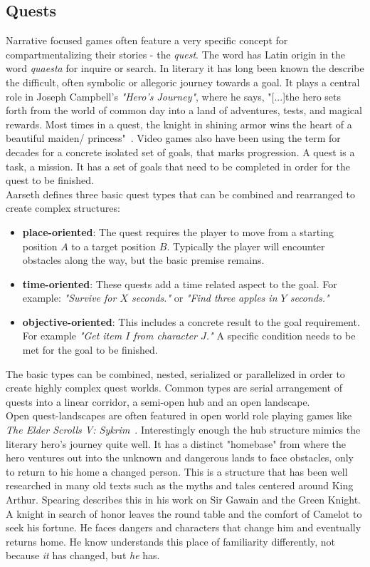 \subsection{Quests}
Narrative focused games often feature a very specific concept for compartmentalizing their stories - the \textit{quest}. The word has Latin origin in the word \textit{quaesta} for inquire or search. In literary it has long been known the describe the difficult, often symbolic or allegoric journey towards a goal. It plays a central role in Joseph Campbell's \textit{"Hero's Journey"}, where he says, "[...]the hero sets forth from the world of common day into a land of adventures, tests, and magical rewards. Most times in a quest, the knight in shining armor wins the heart of a beautiful maiden/ princess"~\cite{Campbell2008}. Video games also have been using the term for decades for a concrete isolated set of goals, that marks progression. A quest is a task, a mission. It has a set of goals that need to be completed in order for the quest to be finished.\\
Aarseth defines three basic quest types that can be combined and rearranged to create complex structures:
\begin{itemize}
	\item \textbf{place-oriented}: The quest requires the player to move from a starting position $A$ to a target position $B$. Typically the player will encounter obstacles along the way, but the basic premise remains.
	\item \textbf{time-oriented}: These quests add a time related aspect to the goal. For example: \textit{"Survive for $X$ seconds."} or \textit{"Find three apples in $Y$ seconds."}
	\item \textbf{objective-oriented}: This includes a concrete result to the goal requirement. For example \textit{"Get item $I$ from character $J$."} A specific condition needs to be met for the goal to be finished.
\end{itemize} 
The basic types can be combined, nested, serialized or parallelized in order to create highly complex quest worlds. Common types are serial arrangement of quests into a linear corridor, a semi-open hub and an open landscape.~\cite{Aarseth2005}\\
Open quest-landscapes are often featured in open world role playing games like \textit{The Elder Scrolls V: Sykrim}~\cite{skyrim}. Interestingly enough the hub structure mimics the literary hero's journey quite well. It has a distinct "homebase" from where the hero ventures out into the unknown and dangerous lands to face obstacles, only to return to his home a changed person. This is a structure that has been well researched in many old texts such as the myths and tales centered around King Arthur. Spearing describes this in his work on Sir Gawain and the Green Knight. A knight in search of honor leaves the round table and the comfort of Camelot to seek his fortune. He faces dangers and characters that change him and eventually returns home. He know understands this place of familiarity differently, not because \textit{it} has changed, but \textit{he} has.~\cite{Spearing1994}\\
